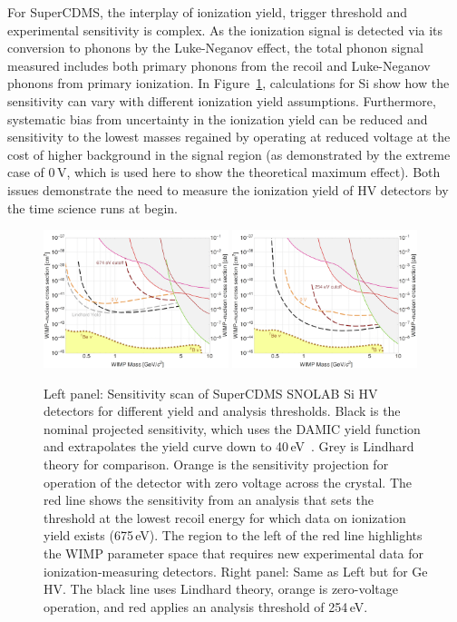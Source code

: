 For SuperCDMS, the interplay of ionization yield, trigger threshold and experimental sensitivity is complex.  As the ionization signal is detected via its conversion to phonons by the Luke-Neganov effect, the total phonon signal measured includes both primary phonons from the recoil and Luke-Neganov phonons from primary ionization. In Figure~\ref{fig:SensitivityYVScanHV}, calculations for Si show how the sensitivity can vary with different ionization yield assumptions.  Furthermore, systematic bias from uncertainty in the ionization yield can be reduced and sensitivity to the lowest masses regained by operating at reduced voltage at the cost of higher background in the signal region (as demonstrated by the extreme case of 0\,V, which is used here to show the theoretical maximum effect).  Both issues demonstrate the need to measure the ionization yield of \scdmssnolab HV detectors by the time science runs at \cute begin.
\begin{figure}[htp]
\centering
\includegraphics[width=0.48\textwidth]{Figures/Sensitivity_Si_YV_Scan}
\includegraphics[width=0.48\textwidth]{Figures/Sensitivity_Ge_YV_Scan}
\caption{Left panel: Sensitivity scan of SuperCDMS SNOLAB Si HV detectors for different yield and analysis thresholds. Black is the nominal projected sensitivity, which uses the DAMIC yield function~\cite{Chavarria:2016arXiv} and extrapolates the yield curve down to 40\,eV~\cite{SuperCDMSSensitvitiy:2016arXiv}. Grey is Lindhard theory for comparison. Orange is the sensitivity projection for operation of the detector with zero voltage across the crystal. The red line shows the sensitivity from an analysis that sets the threshold at the lowest recoil energy for which data on ionization yield exists (675\,eV). The region to the left of the red line highlights the WIMP parameter space that requires new experimental data for ionization-measuring detectors. Right panel: Same as Left but for Ge HV. The black line uses Lindhard theory, orange is zero-voltage operation, and red applies an analysis threshold of 254\,eV.
}
\label{fig:SensitivityYVScanHV}
\end{figure}

